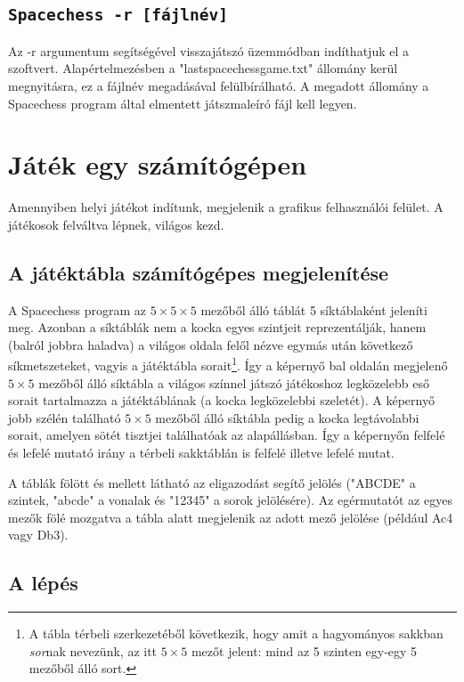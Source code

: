 \documentclass[12pt, twoside]{report}
\begin{document}
\subsection*{\tt Spacechess -r [fájlnév]}
Az -r argumentum segítségével visszajátszó üzemmódban indíthatjuk el a szoftvert. Alapértelmezésben a "lastspacechessgame.txt" állomány kerül megnyitásra, ez a fájlnév megadásával felülbírálható. A megadott állomány a Spacechess program által elmentett játszmaleíró fájl kell legyen.


\section{Játék egy számítógépen}

Amennyiben helyi játékot indítunk, megjelenik a grafikus felhasználói felület. A játékosok felváltva lépnek, világos kezd. 

\subsection{A játéktábla számítógépes megjelenítése}

A Spacechess program az $ 5 \times 5 \times 5 $ mezőből álló táblát 5 síktáblaként jeleníti meg. Azonban a síktáblák nem a kocka egyes szintjeit reprezentálják, hanem (balról jobbra haladva) a világos oldala felől nézve egymás után következő síkmetszeteket, vagyis a játéktábla sorait\footnote{A tábla térbeli szerkezetéből következik, hogy amit a hagyományos sakkban \textit{sor}nak nevezünk, az itt $ 5 \times 5 $ mezőt jelent: mind az 5 szinten egy-egy 5 mezőből álló sort.}. Így a képernyő bal oldalán megjelenő $ 5 \times 5 $ mezőből álló síktábla a világos színnel játszó játékoshoz legközelebb eső sorait tartalmazza a játéktáblának (a kocka legközelebbi szeletét). A képernyő jobb szélén található $ 5 \times 5 $ mezőből álló síktábla pedig a kocka legtávolabbi sorait, amelyen sötét tisztjei találhatóak az alapállásban. Így a képernyőn felfelé és lefelé mutató irány a térbeli sakktáblán is felfelé illetve lefelé mutat. 

A táblák fölött és mellett látható az eligazodást segítő jelölés ("ABCDE" a szintek, "abcde" a vonalak és "12345" a sorok jelölésére). Az egérmutatót az egyes mezők fölé mozgatva a tábla alatt megjelenik az adott mező jelölése (például Ac4 vagy Db3).

\subsection{A lépés}
\end{document}
